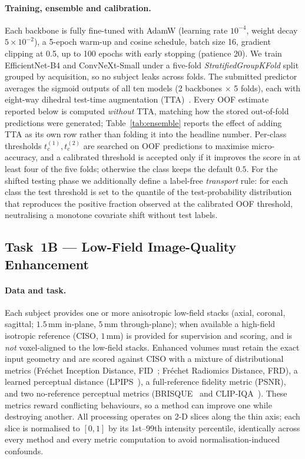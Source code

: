 \documentclass[runningheads]{llncs}
\begin{document}
\paragraph{Training, ensemble and calibration.}
Each backbone is fully fine-tuned with AdamW (learning rate $10^{-4}$, weight
decay $5\!\times\!10^{-2}$), a 5-epoch warm-up and cosine schedule, batch size 16,
gradient clipping at 0.5, up to 100 epochs with early stopping (patience 20). We
train EfficientNet-B4 and ConvNeXt-Small under a five-fold
\emph{StratifiedGroupKFold} split grouped by acquisition, so no subject leaks
across folds. The submitted predictor averages the sigmoid outputs of all ten models
(2 backbones $\times$ 5 folds), each with eight-way dihedral test-time augmentation
(TTA)~\cite{lakshminarayanan2017simple}. Every OOF estimate reported below is computed
\emph{without} TTA, matching how the stored out-of-fold predictions were generated;
Table~\ref{tab:ensemble} reports the effect of adding TTA as its own row rather than
folding it into the headline number. Per-class thresholds
$t^{(1)}_c,t^{(2)}_c$ are searched on OOF predictions to maximise micro-accuracy,
and a calibrated threshold is accepted only if it improves the score in at least
four of the five folds; otherwise the class keeps the default $0.5$. For the
shifted testing phase we additionally define a label-free \emph{transport} rule:
for each class the test threshold is set to the quantile of the test-probability
distribution that reproduces the positive fraction observed at the calibrated OOF
threshold, neutralising a monotone covariate shift without test labels.

\subsection{Task~1B --- Low-Field Image-Quality Enhancement}
\label{sec:m1b}

\paragraph{Data and task.}
Each subject provides one or more anisotropic low-field stacks (axial, coronal,
sagittal; $1.5$\,mm in-plane, $5$\,mm through-plane); when available a high-field
isotropic reference (CISO, $1$\,mm) is provided for supervision and scoring, and
is \emph{not} voxel-aligned to the low-field stacks. Enhanced volumes must retain
the exact input geometry and are scored against CISO with a mixture of
distributional metrics (Fr\'echet Inception Distance, FID~\cite{heusel2017fid};
Fr\'echet Radiomics Distance, FRD), a learned perceptual distance
(LPIPS~\cite{zhang2018lpips}), a full-reference fidelity metric (PSNR), and two
no-reference perceptual metrics (BRISQUE~\cite{mittal2012brisque} and
CLIP-IQA~\cite{wang2023clipiqa}). These metrics reward conflicting behaviours, so
a method can improve one while destroying another. All processing operates on 2-D
slices along the thin axis; each slice is normalised to $[0,1]$ by its 1st--99th
intensity percentile, identically across every method and every metric
computation to avoid normalisation-induced confounds.
\end{document}
